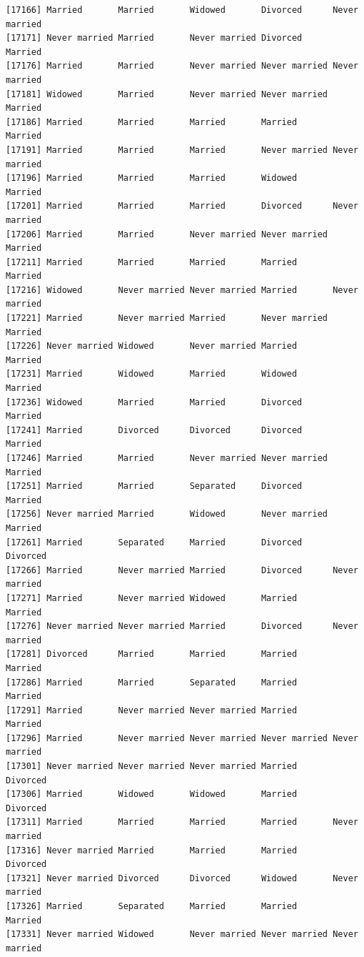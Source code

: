 \documentclass[
  letterpaper,
  DIV=11,
  numbers=noendperiod,
  oneside]{scrartcl}
\begin{document}
\begin{verbatim}
[17166] Married       Married       Widowed       Divorced      Never married
[17171] Never married Married       Never married Divorced      Married      
[17176] Married       Married       Never married Never married Never married
[17181] Widowed       Married       Never married Never married Married      
[17186] Married       Married       Married       Married       Married      
[17191] Married       Married       Married       Never married Never married
[17196] Married       Married       Married       Widowed       Married      
[17201] Married       Married       Married       Divorced      Never married
[17206] Married       Married       Never married Never married Married      
[17211] Married       Married       Married       Married       Married      
[17216] Widowed       Never married Never married Married       Never married
[17221] Married       Never married Married       Never married Married      
[17226] Never married Widowed       Never married Married       Married      
[17231] Married       Widowed       Married       Widowed       Married      
[17236] Widowed       Married       Married       Divorced      Married      
[17241] Married       Divorced      Divorced      Divorced      Married      
[17246] Married       Married       Never married Never married Married      
[17251] Married       Married       Separated     Divorced      Married      
[17256] Never married Married       Widowed       Never married Married      
[17261] Married       Separated     Married       Divorced      Divorced     
[17266] Married       Never married Married       Divorced      Never married
[17271] Married       Never married Widowed       Married       Married      
[17276] Never married Never married Married       Divorced      Never married
[17281] Divorced      Married       Married       Married       Married      
[17286] Married       Married       Separated     Married       Married      
[17291] Married       Never married Never married Married       Married      
[17296] Married       Never married Never married Never married Never married
[17301] Never married Never married Never married Married       Divorced     
[17306] Married       Widowed       Widowed       Married       Divorced     
[17311] Married       Married       Married       Married       Never married
[17316] Never married Married       Married       Married       Divorced     
[17321] Never married Divorced      Divorced      Widowed       Never married
[17326] Married       Separated     Married       Married       Married      
[17331] Never married Widowed       Never married Never married Never married

\end{verbatim}
\end{document}
